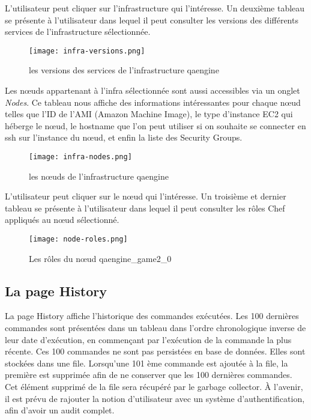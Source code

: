 L'utilisateur peut cliquer sur l'infrastructure qui l'intéresse.
Un deuxième tableau se présente à l'utilisateur dans lequel il peut consulter
les versions des différents services de l'infrastructure sélectionnée.
\begin{figure}[H]
  \texttt{[image: infra-versions.png]}  
  \caption{les versions des services de l'infrastructure qaengine}
\end{figure}

\clearpage
Les nœuds appartenant à l'infra sélectionnée sont aussi accessibles via un
onglet \textit{Nodes}. 
Ce tableau nous affiche des informations intéressantes pour chaque nœud telles
que l'ID de l'AMI (Amazon Machine Image), le type d'instance EC2 qui héberge le
nœud, le hostname que l'on peut utiliser si on souhaite se connecter en ssh sur
l'instance du nœud, et enfin la liste des Security Groups.

\begin{figure}[H]
  \texttt{[image: infra-nodes.png]}  
  \caption{les nœuds de l'infrastructure qaengine}
\end{figure}

\bigskip
L'utilisateur peut cliquer sur le nœud qui l'intéresse.
Un troisième et dernier tableau se présente à l'utilisateur dans lequel il peut
consulter les rôles Chef appliqués au nœud sélectionné.

\begin{figure}[H]
  \texttt{[image: node-roles.png]}  
  \caption{Les rôles du nœud qaengine\_game2\_0}
\end{figure}

\clearpage
\subsection{La page History}

La page History affiche l'historique des commandes exécutées.
Les 100 dernières commandes sont présentées dans un tableau dans l'ordre
chronologique inverse de leur date d'exécution, en commençant par l'exécution de
la commande la plus récente.
Ces 100 commandes ne sont pas persistées en base de données. Elles sont stockées
dans une file. Lorsqu'une 101 ème commande est ajoutée à la file, la première
est supprimée afin de ne conserver que les 100 dernières commandes. Cet élément
supprimé de la file sera récupéré par le garbage collector.
À l'avenir, il est prévu de rajouter la notion d'utilisateur avec un système
d'authentification, afin d'avoir un audit complet.

